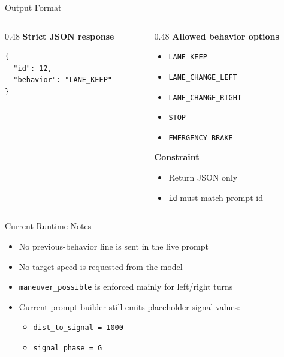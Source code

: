 \documentclass[aspectratio=169]{beamer}
\begin{document}
\begin{frame}[fragile]{Output Format}
\begin{columns}[T]
    \begin{column}{0.48\textwidth}
        \textbf{Strict JSON response}
        \begin{lstlisting}[style=codestyle]
{
  "id": 12,
  "behavior": "LANE_KEEP"
}
        \end{lstlisting}
    \end{column}
    \begin{column}{0.48\textwidth}
        \textbf{Allowed behavior options}
        \begin{itemize}
            \item \texttt{LANE\_KEEP}
            \item \texttt{LANE\_CHANGE\_LEFT}
            \item \texttt{LANE\_CHANGE\_RIGHT}
            \item \texttt{STOP}
            \item \texttt{EMERGENCY\_BRAKE}
        \end{itemize}

        \textbf{Constraint}
        \begin{itemize}
            \item Return JSON only
            \item \texttt{id} must match prompt id
        \end{itemize}
    \end{column}
\end{columns}
\end{frame}

\begin{frame}{Current Runtime Notes}
\begin{itemize}
    \item No previous-behavior line is sent in the live prompt
    \item No target speed is requested from the model
    \item \texttt{maneuver\_possible} is enforced mainly for left/right turns
    \item Current prompt builder still emits placeholder signal values:
    \begin{itemize}
        \item \texttt{dist\_to\_signal = 1000}
        \item \texttt{signal\_phase = G}
    \end{itemize}
\end{itemize}
\end{frame}
\end{document}
